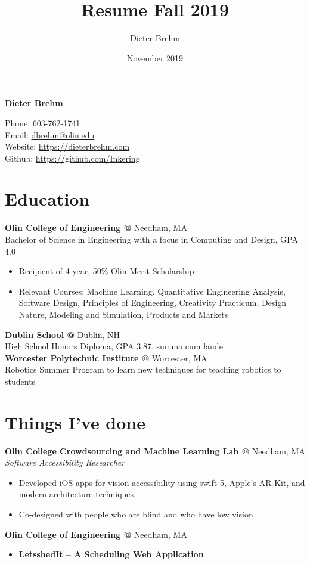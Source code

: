 \documentclass[10pt]{article} %
\title{Resume Fall 2019}
\author{Dieter Brehm}
\date{November 2019}
\begin{document}
{\LARGE\bfseries Dieter Brehm} %

Phone: 603-762-1741\\ %
Email: \href{mailto:dbrehm@olin.edu}{dbrehm@olin.edu}\\ %
Website: \href{https://dieterbrehm.com}{https://dieterbrehm.com}\\ %
Github: \href{https://github.com/Inkering}{https://github.com/Inkering}\\ %

\begin{minipage}[t]{0.8\textwidth}
\section*{Education}
\textbf{Olin College of Engineering @} \space Needham, MA\\
Bachelor of Science in Engineering with a focus in Computing and Design, GPA 4.0\\
\begin{itemize} [noitemsep,topsep=0pt]
  \item Recipient of 4-year, 50\% Olin Merit Scholarship
  \item Relevant Courses: Machine Learning, Quantitative Engineering Analysis, Software Design, Principles of Engineering, Creativity Practicum, Design Nature, Modeling and Simulation, Products and Markets
  \\
\end{itemize}
\textbf{Dublin School @} \space Dublin, NH\\
High School Honors Diploma, GPA 3.87, summa cum laude\\
\textbf{Worcester Polytechnic Institute @} \space Worcester, MA\\
Robotics Summer Program to learn new techniques for teaching robotics to students

\section*{Things I've done}
\textbf{Olin College Crowdsourcing and Machine Learning Lab @} \space Needham, MA\\
\textit{Software Accessibility Researcher}\\
\begin{itemize} [noitemsep,topsep=0pt]
  \item Developed iOS apps for vision accessibility using swift 5, Apple’s AR Kit, and modern architecture techniques.
  \item Co-designed with people who are blind and who have low vision
  \\
\end{itemize}
\textbf{Olin College of Engineering @} \space Needham, MA\\
\begin{itemize} [noitemsep,topsep=0pt]
  \item {}\textbf{LetsshedIt – A Scheduling Web Application}
  

\end{itemize}
\end{minipage}
\end{document}
